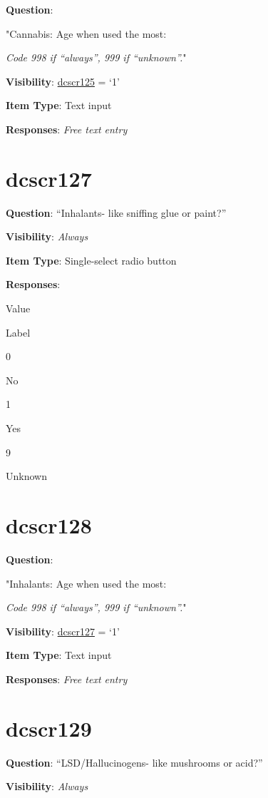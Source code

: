 \documentclass[]{book}
\begin{document}
\textbf{Question}:

"Cannabis: Age when used the most:

\emph{Code 998 if ``always'', 999 if ``unknown''.}"

\textbf{Visibility}: \protect\hyperlink{dcscr125}{dcscr125} = `1'

\textbf{Item Type}: Text input

\textbf{Responses}: \emph{Free text entry}

\hypertarget{dcscr127}{%
\section{dcscr127}\label{dcscr127}}

\textbf{Question}: ``Inhalants- like sniffing glue or paint?''

\textbf{Visibility}: \emph{Always}

\textbf{Item Type}: Single-select radio button

\textbf{Responses}:

Value

Label

0

No

1

Yes

9

Unknown

\hypertarget{dcscr128}{%
\section{dcscr128}\label{dcscr128}}

\textbf{Question}:

"Inhalants: Age when used the most:

\emph{Code 998 if ``always'', 999 if ``unknown''.}"

\textbf{Visibility}: \protect\hyperlink{dcscr127}{dcscr127} = `1'

\textbf{Item Type}: Text input

\textbf{Responses}: \emph{Free text entry}

\hypertarget{dcscr129}{%
\section{dcscr129}\label{dcscr129}}

\textbf{Question}: ``LSD/Hallucinogens- like mushrooms or acid?''

\textbf{Visibility}: \emph{Always}
\end{document}
